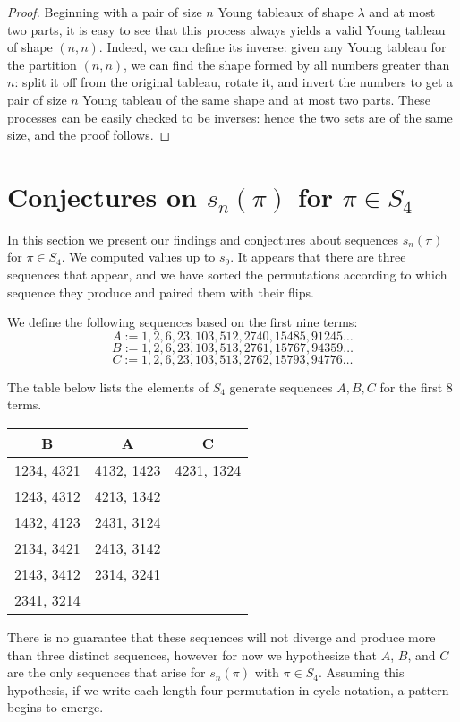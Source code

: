 \documentclass[11pt,letterpaper,twoside,english]{article}
\theoremstyle{theorem}
\theoremstyle{remark}
\begin{document}
\begin{proof}
Beginning with a pair of size $n$ Young tableaux of shape $\lambda$ and at most two parts, it is easy to see that this process always yields a valid Young tableau of shape $(n, n)$. Indeed, we can define its inverse: given any Young tableau for the partition $(n, n)$, we can find the shape formed by all numbers greater than $n$: split it off from the original tableau, rotate it, and invert the numbers to get a pair of size $n$ Young tableau of the same shape and at most two parts. These processes can be easily checked to be inverses: hence the two sets are of the same size, and the proof follows.
\end{proof}

\section{Conjectures on $s_n(\pi)$ for $\pi\in S_4$}
\label{S4}

In this section we present our findings and conjectures about sequences $s_n(\pi)$ for $\pi\in S_4$. We computed values up to $s_{9}$. It appears that there are three sequences that appear, and we have sorted the permutations according to which sequence they produce and paired them with their flips.  

We define the following sequences based on the first nine terms:
$$
A:=1,2,6,23,103,512,2740,15485,91245\ldots
$$
$$
B:=1,2,6,23,103,513,2761,15767,94359\ldots
$$
$$
C:=1,2,6,23,103,513,2762,15793,94776\ldots
$$

The table below lists the elements of $S_4$ generate sequences $A,B,C$ for the first 8 terms.

\begin{center}
\begin{tabular}{|c|c|c|}
B &A&C\\
\hline
1234, 4321&4132, 1423&4231, 1324\\
1243, 4312&4213, 1342&\\
1432, 4123&2431, 3124&\\
2134, 3421&2413, 3142&\\
2143, 3412&2314, 3241&\\
2341, 3214&&\\
\end{tabular}
\end{center}

There is no guarantee that these sequences will not diverge and produce more than three distinct sequences, however for now we hypothesize that $A$, $B$, and $C$ are the only sequences that arise for $s_n(\pi)$ with $\pi\in S_4$. Assuming this hypothesis, if we write each length four permutation in cycle notation, a pattern begins to emerge. 
\end{document}
